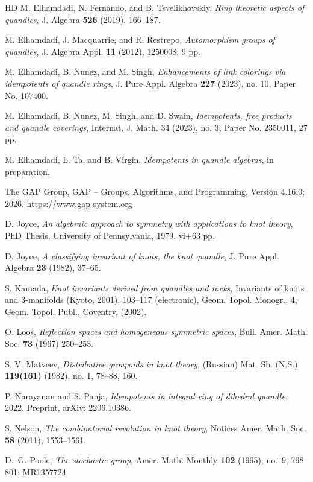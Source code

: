 \documentclass[12 pt]{amsart}
\theoremstyle{definition}
\theoremstyle{remark}
\numberwithin{equation}{section}
\begin{document}
\begin{thebibliography}{HD}
 M. Elhamdadi, N. Fernando, and B. Tsvelikhovskiy, \textit{Ring theoretic aspects of quandles}, J. Algebra {\bf 526} (2019), 166--187.

 M. Elhamdadi, J. Macquarrie,  and R. Restrepo,  \textit{Automorphism groups of quandles}, J. Algebra Appl. {\bf 11} (2012), 1250008, 9 pp.

 M. Elhamdadi, B. Nunez, and M. Singh, \textit{Enhancements of link colorings via idempotents of quandle rings}, J. Pure Appl. Algebra {\bf227} (2023), no. 10, Paper No. 107400.

 M. Elhamdadi, B. Nunez, M. Singh, and D. Swain, \emph{Idempotents, free products and quandle coverings}, Internat. J. Math. 34 (2023), no. 3, Paper No. 2350011, 27 pp.

 M. Elhamdadi, L. Ta, and B. Virgin, \emph{Idempotents in quandle algebras}, in preparation. 

 The GAP Group, GAP -- Groups, Algorithms, and Programming, Version 4.16.0; 2026. \url{https://www.gap-system.org}

 D. Joyce, \textit{An algebraic approach to symmetry with applications to knot theory}, PhD Thesis, University of Pennsylvania, 1979. vi+63 pp.

 D. Joyce, \textit{A classifying invariant of knots, the knot quandle}, J. Pure Appl. Algebra {\bf 23} (1982), 37--65.

 S. Kamada, \textit{Knot invariants derived from quandles and racks}, Invariants of knots and 3-manifolds (Kyoto, 2001), 103--117 (electronic), Geom. Topol. Monogr., 4, Geom. Topol. Publ., Coventry, (2002).

  O. Loos,  \textit{Reflection spaces and homogeneous symmetric spaces}, Bull. Amer. Math. Soc. {\bf 73} (1967) 250--253.

 S. V. Matveev, \textit{Distributive groupoids in knot theory}, (Russian) Mat. Sb. (N.S.) {\bf119(161)} (1982), no. 1, 78--88, 160.

 P. Narayanan and S. Panja, \textit{Idempotents in integral ring of dihedral quandle}, 2022. Preprint, arXiv: 2206.10386.

 S. Nelson, \textit{The combinatorial revolution in knot theory}, Notices Amer. Math. Soc. {\bf 58} (2011), 1553--1561.

 D.~G. Poole, \textit{The stochastic group}, Amer. Math. Monthly {\bf 102} (1995), no.~9, 798--801; MR1357724


\end{thebibliography}
\end{document}
